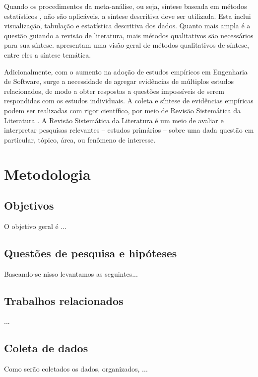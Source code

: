 \documentclass[12pt]{article}
\begin{document}
Quando os procedimentos da meta-análise, ou seja, síntese baseada em métodos
estatísticos \cite{Almqvist2006}, não são aplicáveis, a síntese descritiva
deve ser utilizada. Esta inclui visualização, tabulação e estatística
descritiva dos dados. Quanto mais ampla é a questão guiando a revisão de
literatura, mais métodos qualitativos são necessários para sua síntese.
 apresentam uma visão geral de métodos qualitativos de
síntese, entre eles a síntese temática.

Adicionalmente, com o aumento na adoção de estudos empíricos em Engenharia de
Software, surge a necessidade de agregar evidências de múltiplos estudos
relacionados, de modo a obter respostas a questões impossíveis de serem
respondidas com os estudos individuais. A coleta e síntese de evidências
empíricas podem ser realizadas com rigor científico, por meio de Revisão
Sistemática da Literatura \cite{Kitchenham2007}. A Revisão Sistemática da
Literatura  é um meio de avaliar e interpretar pesquisas relevantes -- estudos
primários -- sobre uma dada questão em particular, tópico, área, ou fenômeno
de interesse.

\section{Metodologia}

\subsection{Objetivos}

O objetivo geral é ...

\subsection{Questões de pesquisa e hipóteses}

Baseando-se nisso levantamos as seguintes...

\subsection{Trabalhos relacionados}

...

\subsection{Coleta de dados}

Como serão coletados os dados, organizados, ...
\end{document}
